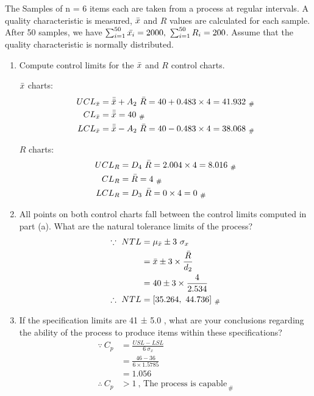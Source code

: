 The Samples of n = 6 items each are taken from a process at regular intervals. A quality characteristic is measured, $\Bar{x}$ and $R$ values are calculated for each sample. After 50 samples, we have $\sum_{i=1}^{50} \Bar{x_i} = 2000, \ \sum_{i=1}^{50} R_i = 200$. Assume that the quality characteristic is normally distributed.

\begin{enumerate}
    \item Compute control limits for the $\Bar{x}$ and $R$ control charts.
        
        $\Bar{x}$ charts:
        \begin{align*}
            UCL_{\Bar{x}} &= \Bar{\Bar{x}} + A_2 \ \Bar{R} = 40 + 0.483 \times 4 = 41.932_{\ \#}\\
            CL_{\Bar{x}} &= \Bar{\Bar{x}} = 40_{\ \#}\\
            LCL_{\Bar{x}} &= \Bar{\Bar{x}} - A_2 \ \Bar{R} = 40 - 0.483 \times 4 = 38.068_{\ \#}
        \end{align*}
        
        $R$ charts:
        \begin{align*}
            UCL_{R} &= D_4 \ \Bar{R} = 2.004 \times 4 = 8.016_{\ \#}\\
            CL_{R} &= \Bar{R} = 4_{\ \#}\\
            LCL_{R} &= D_3 \ \Bar{R} = 0 \times 4 = 0_{\ \#}
        \end{align*}

    \item  All points on both control charts fall between the control limits computed in part (a). What are the natural tolerance limits of the process?
        \begin{align*}
            \because \ NTL &= \mu_{\Bar{x}} \pm 3 \ \sigma_x \\
            &= \Bar{x} \pm 3 \times \frac{\Bar{R}}{d_2} \\
            &= 40 \pm 3 \times \frac{4}{2.534}\\
            \therefore \ NTL &= [35.264, \ 44.736]_{\ \#}
        \end{align*}

    \item If the specification limits are 41 ± 5.0 , what are your conclusions regarding the ability of the process to produce items within these specifications?
        \begin{align*}
            \because \ C_p &= \frac{USL - LSL}{6 \ \sigma_x}\\
            &= \frac{46 - 36}{6 \times 1.5785}\\
            &= 1.056\\
            \therefore \ C_p &> 1 \ \text{, The process is capable}_{\ \#}
        \end{align*}\pagebreak
    

\end{enumerate}
